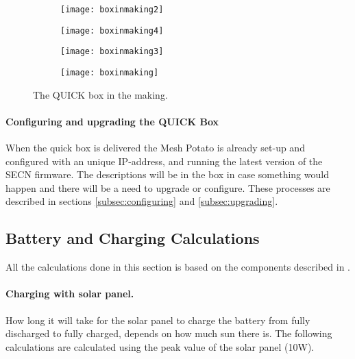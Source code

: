 \begin{figure}
        \centering
        \begin{subfigure}[t]{0.4\textwidth}
                \texttt{[image: boxinmaking2]}
                \label{fig:boxinmaking2}
        \end{subfigure}
        \begin{subfigure}[t]{0.4\textwidth}
                \texttt{[image: boxinmaking4]}
                \label{fig:boxinmaking}
        \end{subfigure}
         \begin{subfigure}[t]{0.3\textwidth}
                \texttt{[image: boxinmaking3]} 
                \label{fig:boxinmaking3}
        \end{subfigure}
        \begin{subfigure}[t]{0.4\textwidth}
                \texttt{[image: boxinmaking]} 
                \label{fig:boxinmaking4}
        \end{subfigure}
\caption{The QUICK box in the making.} \label{fig:boxinmaking}
\end{figure}

\paragraph{Configuring and upgrading the QUICK Box}
When the \gls{quick} box is delivered the Mesh Potato is already set-up and configured with an unique IP-address, and running the latest version of the SECN firmware. The descriptions will be in the box in case something would happen and there will be a need to upgrade or configure. These processes are described in sections \ref{subsec:configuring} and \ref{subsec:upgrading}.

\subsection{Battery and Charging Calculations}
All the calculations done in this section is based on the components described in . 

\paragraph{Charging with solar panel.}
How long it will take for the solar panel to charge the battery from fully discharged to fully charged, depends on how much sun there is. The following calculations are calculated using the peak value of the solar panel (10W). 

